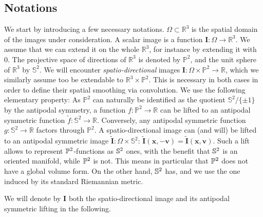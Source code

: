 \documentclass[twocolumn]{svjour3}
\begin{document}
\subsection{Notations}
We start by introducing a few necessary notations. $\Omega\subset \mathbb R^3$ is the
spatial domain of the images under consideration. A scalar image is a function
$\bm I:\Omega\to\mathbb R^3$. We assume that we can extend it on the whole $\mathbb R^3$,
for instance by extending it with 0. The projective space of directions of $\mathbb R^3$
is denoted by $\mathbb P^2$, and the unit sphere of $\mathbb R^3$ by $\mathbb S^2$.  We
will encounter \emph{spatio-directional} images
$\bm I:\Omega\times \mathbb P^2 \to \mathbb R$, which we similarly assume too be
extendable to $\mathbb R^3\times \mathbb P^2$. This is necessary in both cases in order to
define their spatial smoothing via convolution. We use the following elementary property:
As $\mathbb P^2$ can naturally be identified as the quotient $\mathbb S^2/\{\pm 1\}$ by
the antipodal symmetry, a function $f:\mathbb P^2\to \mathbb R$ can be lifted to an
antipodal symmetric function $\tilde{f}:\mathbb{S}^2\to \mathbb{R}$. Conversely, any
antipodal symmetric function $g:\mathbb S^2\to \mathbb R$ factors through $\mathbb P^2$.
A spatio-directional image can (and will) be lifted to an antipodal symmetric image
$\tilde{\bm I}:\Omega\times \mathbb S^2$:
$\tilde{\bm I}(\bm x, -\bm v) =\tilde{\bm I}(\bm x, \bm v)$.  Such a lift allows to represent ${\mathbb P}^2$-functions as ${\mathbb S}^2$ ones, 
with the benefit that ${\mathbb S}^2$ is an oriented manifold, while ${\mathbb P}^2$ is not. This means in particular that ${\mathbb P}^2$ does not have a global volume form.
On the other hand, ${\mathbb S}^2$ has, and we use the one induced by its standard Riemannian metric.

We will denote by $\bm I$
both the spatio-directional image and its antipodal symmetric lifting in the following.
\end{document}
